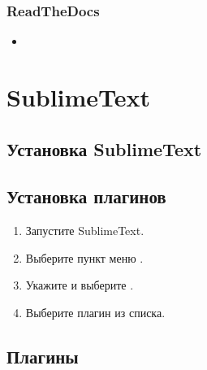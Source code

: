 \documentclass[letterpaper,12pt,russian]{sphinxmanual}
\begin{document}
\subsubsection{ReadTheDocs}
\label{\detokenize{start:readthedocs}}\begin{itemize}
\item {} 
\begin{quote}
\end{quote}

\end{itemize}


\section{SublimeText}
\label{\detokenize{editor:sublimetext}}\label{\detokenize{editor::doc}}

\subsection{Установка SublimeText}
\label{\detokenize{editor:id1}}


\subsection{Установка плагинов}
\label{\detokenize{editor:id3}}\begin{enumerate}
%
\item {} 
Запустите SublimeText.

\item {} 
Выберите пункт меню .

\item {} 
Укажите  и выберите .

\item {} 
Выберите плагин из списка.

\end{enumerate}


\subsection{Плагины}
\label{\detokenize{editor:id4}}
\end{document}
